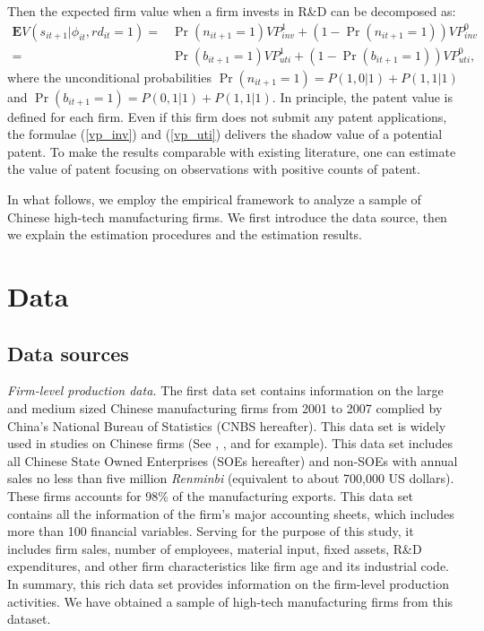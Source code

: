 \documentclass[11pt]{article}
\begin{document}
Then the expected firm value when a firm invests in R\&D can be decomposed as:
\begin{align}
    \mathbf{E}V(s_{it+1}|\phi_{it}, rd_{it}=1)=& \Pr(n_{it+1}=1)VP_{inv}^1 + (1-\Pr(n_{it+1}=1))VP_{inv}^0 \\
                                              =& \Pr(b_{it+1}=1)VP_{uti}^1+ (1-\Pr(b_{it+1}=1))VP_{uti}^0, \nonumber
\end{align}
where the unconditional probabilities $\Pr(n_{it+1}=1) = P(1, 0|1)+P(1,1|1)$ and $\Pr(b_{it+1}=1) = P(0, 1|1)+P(1,1|1)$. In principle, the patent value is defined for each firm. Even if this firm does not submit any patent applications, the formulae (\ref{vp_inv}) and (\ref{vp_uti}) delivers the shadow value of a potential patent. To make the results comparable with existing literature, one can estimate the value of patent focusing on observations with positive counts of patent. 

In what follows, we employ the empirical framework to analyze a sample of Chinese high-tech manufacturing firms. We first introduce the data source, then we explain the estimation procedures and the estimation results. 


\section{Data}
\subsection{Data sources}
\textit{Firm-level production data.}
The first data set contains information on the large and medium sized Chinese manufacturing firms from 2001 to 2007 complied by China's National Bureau of Statistics (CNBS hereafter). This data set is widely used in studies on Chinese firms (See \cite{HsiehKlenow}, \cite{song2011}, and \cite{BRANDT2012339} for example). This data set includes all Chinese State Owned Enterprises (SOEs hereafter) and non-SOEs with annual sales no less than five million \textit{Renminbi} (equivalent to about 700,000 US dollars). These firms accounts for 98\% of the manufacturing exports. This data set contains all the information of the firm's major accounting sheets, which includes more than 100 financial variables. Serving for the purpose of this study, it includes firm sales, number of employees, material input, fixed assets, R\&D expenditures, and other firm characteristics like firm age and its industrial code. In summary, this rich data set provides information on the firm-level production activities. We have obtained a sample of high-tech manufacturing firms from this dataset. 
\end{document}
